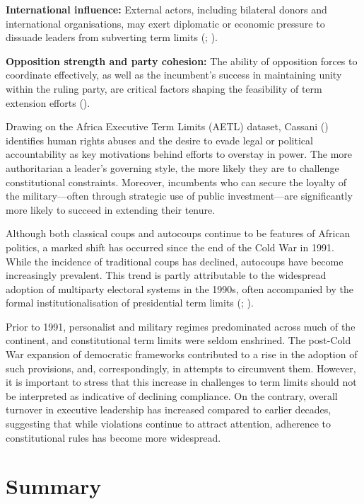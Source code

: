 \documentclass[
  12pt,
]{report}
\begin{document}
\textbf{International influence:} External actors, including bilateral
donors and international organisations, may exert diplomatic or economic
pressure to dissuade leaders from subverting term limits
(;
).

\textbf{Opposition strength and party cohesion:} The ability of
opposition forces to coordinate effectively, as well as the incumbent's
success in maintaining unity within the ruling party, are critical
factors shaping the feasibility of term extension efforts
().

Drawing on the Africa Executive Term Limits (AETL) dataset, Cassani
() identifies human rights abuses and
the desire to evade legal or political accountability as key motivations
behind efforts to overstay in power. The more authoritarian a leader's
governing style, the more likely they are to challenge constitutional
constraints. Moreover, incumbents who can secure the loyalty of the
military---often through strategic use of public investment---are
significantly more likely to succeed in extending their tenure.

Although both classical coups and autocoups continue to be features of
African politics, a marked shift has occurred since the end of the Cold
War in 1991. While the incidence of traditional coups has declined,
autocoups have become increasingly prevalent. This trend is partly
attributable to the widespread adoption of multiparty electoral systems
in the 1990s, often accompanied by the formal institutionalisation of
presidential term limits (;
).

Prior to 1991, personalist and military regimes predominated across much
of the continent, and constitutional term limits were seldom enshrined.
The post-Cold War expansion of democratic frameworks contributed to a
rise in the adoption of such provisions, and, correspondingly, in
attempts to circumvent them. However, it is important to stress that
this increase in challenges to term limits should not be interpreted as
indicative of declining compliance. On the contrary, overall turnover in
executive leadership has increased compared to earlier decades,
suggesting that while violations continue to attract attention,
adherence to constitutional rules has become more widespread.

\section{Summary}\label{summary}
\end{document}
